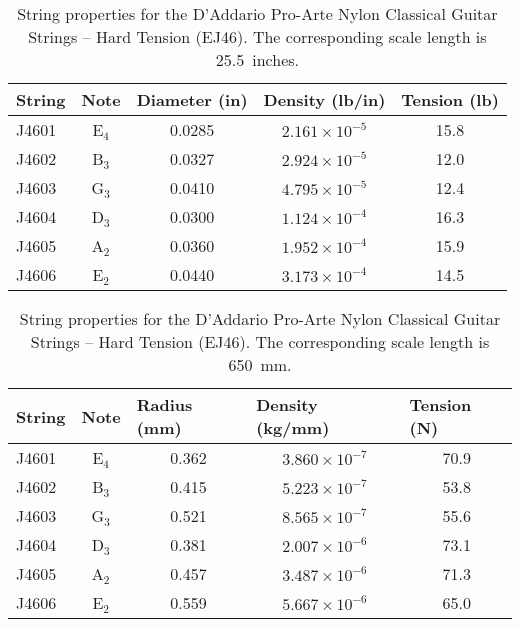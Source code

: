\begin{table}[htbp]
  \centering
  \caption{\label{tbl:ej46_ips} String properties for the D'Addario Pro-Arte Nylon Classical Guitar Strings -- Hard Tension (EJ46). The corresponding scale length is 25.5~inches.}
    \begin{tabular}{lcccc}
    \hline \hline
    String  & Note  & \multicolumn{1}{l}{Diameter (in)} & \multicolumn{1}{l}{Density (lb/in)} & \multicolumn{1}{l}{Tension (lb)} \\
    \hline
    J4601 & E$_4$  & 0.0285 & $2.161 \times 10^{-5}$ & 15.8 \\
    J4602 & B$_3$  & 0.0327 & $2.924 \times 10^{-5}$ & 12.0 \\
    J4603 & G$_3$  & 0.0410 & $4.795 \times 10^{-5}$ & 12.4 \\
    J4604 & D$_3$  & 0.0300 & $1.124 \times 10^{-4}$ & 16.3 \\
    J4605 & A$_2$  & 0.0360 & $1.952 \times 10^{-4}$ & 15.9 \\
    J4606 & E$_2$  & 0.0440 & $3.173 \times 10^{-4}$ & 14.5 \\
    \hline
    \end{tabular}%
  \label{tab:addlabel}%
\end{table}%

\begin{table}[htbp]
  \centering
  \caption{\label{tbl:ej46_mks} String properties for the D'Addario Pro-Arte Nylon Classical Guitar Strings -- Hard Tension (EJ46). The corresponding scale length is 650~mm.}
    \begin{tabular}{lcccc}
    \hline \hline
    String  & Note  & \multicolumn{1}{l}{Radius (mm)} & \multicolumn{1}{l}{Density (kg/mm)} & \multicolumn{1}{l}{Tension (N)} \\
    \hline
    J4601 & E$_4$  & 0.362 & $3.860 \times 10^{-7}$ & 70.9 \\
    J4602 & B$_3$  & 0.415 & $5.223 \times 10^{-7}$ & 53.8 \\
    J4603 & G$_3$  & 0.521 & $8.565 \times 10^{-7}$ & 55.6 \\
    J4604 & D$_3$  & 0.381 & $2.007 \times 10^{-6}$ & 73.1 \\
    J4605 & A$_2$  & 0.457 & $3.487 \times 10^{-6}$ & 71.3 \\
    J4606 & E$_2$  & 0.559 & $5.667 \times 10^{-6}$ & 65.0 \\
    \hline
    \end{tabular}%
  \label{tab:addlabel}%
\end{table}%

